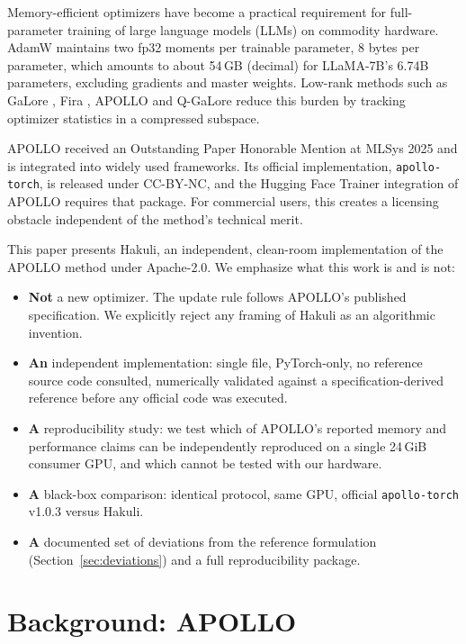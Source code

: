 \documentclass[11pt]{article}
\begin{document}
Memory-efficient optimizers have become a practical requirement for
full-parameter training of large language models (LLMs) on commodity
hardware. AdamW \citep{loshchilov2019adamw} maintains two fp32 moments per
trainable parameter, 8 bytes per parameter, which amounts to about 54\,GB
(decimal) for LLaMA-7B's 6.74B parameters, excluding gradients and master
weights. Low-rank methods such as
GaLore \citep{zhao2024galore}, Fira \citep{chen2025fira}, APOLLO
\citep{zhu2025apollo} and Q-GaLore \citep{zhang2024qgalore} reduce this
burden by tracking optimizer statistics in a compressed subspace.

APOLLO received an Outstanding Paper Honorable Mention at MLSys 2025 and is
integrated into widely used frameworks. Its official implementation,
\texttt{apollo-torch}, is released under CC-BY-NC, and the Hugging Face
Trainer integration of APOLLO requires that package. For commercial users,
this creates a licensing obstacle independent of the method's technical
merit.

This paper presents Hakuli, an independent, clean-room implementation of the
APOLLO method under Apache-2.0. We emphasize what this work is and is not:

\begin{itemize}
  \item \textbf{Not} a new optimizer. The update rule follows APOLLO's
  published specification. We explicitly reject any framing of Hakuli as an
  algorithmic invention.
  \item \textbf{An} independent implementation: single file, PyTorch-only, no
  reference source code consulted, numerically validated against a
  specification-derived reference before any official code was executed.
  \item \textbf{A} reproducibility study: we test which of APOLLO's reported
  memory and performance claims can be independently reproduced on a single
  24\,GiB consumer GPU, and which cannot be tested with our hardware.
  \item \textbf{A} black-box comparison: identical protocol, same GPU, official
  \texttt{apollo-torch} v1.0.3 versus Hakuli.
  \item \textbf{A} documented set of deviations from the reference formulation
  (Section~\ref{sec:deviations}) and a full reproducibility package.
\end{itemize}

\section{Background: APOLLO}
\label{sec:background}
\end{document}
